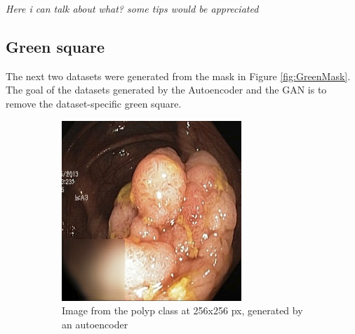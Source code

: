 \vspace{5px}
\textit{Here i can talk about what? some tips would be appreciated }


\subsection{Green square}
The next two datasets were generated from the mask in Figure \ref{fig:GreenMask}.  The goal of the datasets generated by the Autoencoder and the GAN is to remove the dataset-specific green square. 


        \begin{figure}
        \centering
        \begin{subfigure}[t]{0.4\textwidth}
            \centering
            \includegraphics[width=\textwidth]{experiments/figures/greensquare/polypAE.png}
            \caption{Image from the polyp class at 256x256 px, generated by an autoencoder }   
            \label{fig:polyp_AE_SQUARE1}
        \end{subfigure}
        \qquad
        \begin{subfigure}[t]{0.4\textwidth}  
            \centering 

\end{subfigure}
\end{figure}
